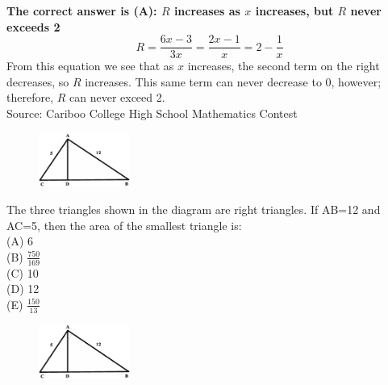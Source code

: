 \documentclass{article}
\begin{document}
\textbf{The correct answer is (A): $R$ increases as $x$ increases, but $R$ never exceeds 2}\\
\begin{equation*}
R=\frac{6x-3}{3x}=\frac{2x-1}{x}=2-\frac{1}{x}
\end{equation*}
From this equation we see that as $x$ increases, the second term on the right decreases, so $R$ increases. This same term can never decrease to 0, however; therefore, $R$ can never exceed 2.
\\[5 ex]

\scriptsize
Source: Cariboo College High School Mathematics Contest

\normalsize
\begin{figure}
	\includegraphics[width=30mm,viewport=32 226 524 516]{CCSPR74-7pic.eps}
\end{figure}
The three triangles shown in the diagram are right triangles. If AB=12 and AC=5, then the area of the smallest triangle is:\\
(A) 6\\
(B) $\frac{750}{169}$\\
(C) 10\\
(D) 12\\
(E) $\frac{150}{13}$\\

\begin{figure}
	\includegraphics[width=30mm,viewport=32 226 524 516]{CCSPR74-7pic.eps}
\end{figure}
\end{document}
